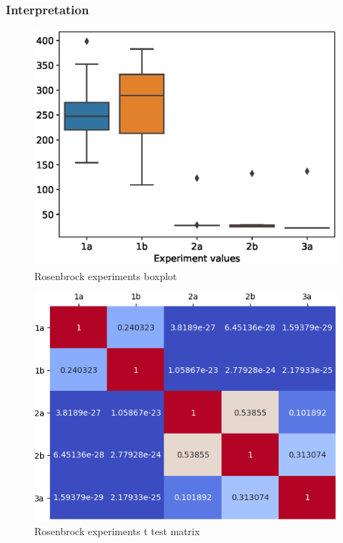 \documentclass{article}
\begin{document}
\subsubsection{Interpretation}
\begin{figure}[!htbp]
	\centering
	\begin{minipage}{\textwidth}
		\centering
		\includegraphics[scale=.8]{boxplots/rosenbrock_boxplot.eps}
		\caption{Rosenbrock experiments boxplot}
		\label{fig:rosenbrock_experiments_boxplot}
	\end{minipage}\hfill
\end{figure}
\FloatBarrier

\begin{figure}[!htbp]
	\centering
	\begin{minipage}{\textwidth}
		\centering
		\includegraphics[scale=.8]{t_test/rosenbrock_t_test_matrix.png}
		\caption{Rosenbrock experiments t test matrix}
	\end{minipage}\hfill
\end{figure}
\FloatBarrier
\end{document}
